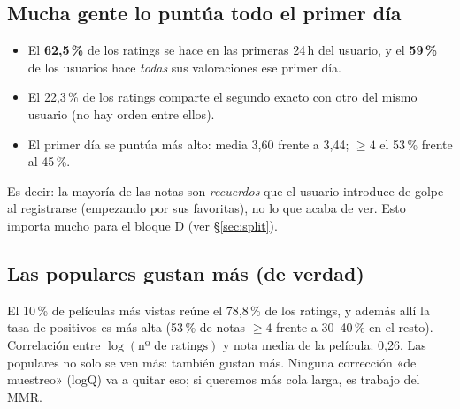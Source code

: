 \documentclass[a4paper,11pt]{article}
\begin{document}
\subsection{Mucha gente lo puntúa todo el primer día}
\begin{itemize}
  \item El \textbf{62,5\,\%} de los ratings se hace en las primeras 24\,h del usuario, y el \textbf{59\,\%} de los usuarios
        hace \emph{todas} sus valoraciones ese primer día.
  \item El 22,3\,\% de los ratings comparte el segundo exacto con otro del mismo usuario (no hay orden entre ellos).
  \item El primer día se puntúa más alto: media 3,60 frente a 3,44; $\ge 4$ el 53\,\% frente al 45\,\%.
\end{itemize}
Es decir: la mayoría de las notas son \emph{recuerdos} que el usuario introduce de golpe al registrarse (empezando por
sus favoritas), no lo que acaba de ver. Esto importa mucho para el bloque D (ver \S\ref{sec:split}).

\subsection{Las populares gustan más (de verdad)}
\begin{center}
\end{center}
El 10\,\% de películas más vistas reúne el 78,8\,\% de los ratings, y además allí la tasa de positivos es más alta
(53\,\% de notas $\ge 4$ frente a 30--40\,\% en el resto). Correlación entre $\log(\text{nº de ratings})$ y nota media de la
película: 0,26. Las populares no solo se ven más: también gustan más. Ninguna corrección «de muestreo» (logQ) va a
quitar eso; si queremos más cola larga, es trabajo del MMR.
\end{document}
